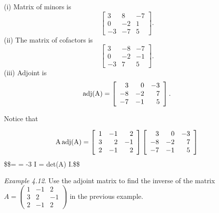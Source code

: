 \documentclass[
  letterpaper,
  DIV=11,
  numbers=noendperiod]{scrartcl}
\theoremstyle{remark}
\begin{document}
(i) Matrix of minors is \[\left[
\begin{array}{rrr}
3 & 8 & -7\\
0 & -2 & 1\\
-3 & -7 & 5
\end{array}
\right].\] (ii) The matrix of cofactors is \[\left[
\begin{array}{rrr}
3 & -8 & -7\\
0 & -2 & -1\\
-3 & 7 & 5
\end{array}
\right].\] (iii) Adjoint is \[{\rm adj}({\rm A}) = \left[
\begin{array}{rrr}
3 & 0 & -3\\
-8 & -2 & 7\\
-7 & -1 & 5
\end{array}
\right].\]

Notice that

\[{\rm A} \,  {\rm adj}({\rm A}) = \left[
\begin{array}{rrr}
1 & -1 & 2\\
3 & 2 & -1\\
2 & -1 & 2\\
\end{array}
\right]
\left[
\begin{array}{rrr}
3 & 0 & -3\\
-8 & -2 & 7\\
-7 & -1 & 5
\end{array}
\right]\] \$\$=  = -3 I = det(A) I.\$\$

\emph{Example 4.12}. Use the adjoint matrix to find the inverse of the
matrix
\(A=\left(\begin{array}{rrr}1 & -1 & 2 \\ 3 & 2 & -1 \\ 2 & -1 & 2\end{array}\right)\)
in the previous example.
\end{document}
